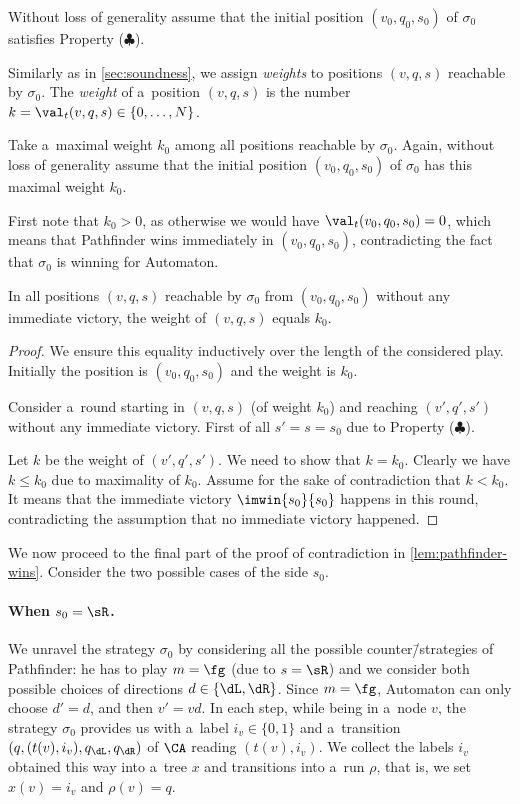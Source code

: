 \documentclass{lmcs}
\numberwithin{equation}{section}
\numberwithin{figure}{section}
\begin{document}
Without loss of generality assume that the initial position $(v_0,q_0,s_0)$ of $\sigma_0$ satisfies Property ($\clubsuit$).

Similarly as in \cref{sec:soundness}, we assign \emph{weights} to positions $(v,q,s)$ reachable by $\sigma_0$.
The \emph{weight} of a~position $(v,q,s)$ is the number $k=\val_t(v,q,s)\in\{0,\ldots,N\}$.

Take a~maximal weight $k_0$ among all positions reachable by $\sigma_0$.
Again, without loss of generality assume that the initial position $(v_0,q_0,s_0)$ of $\sigma_0$ has this maximal weight $k_0$.

First note that $k_0>0$, as otherwise we would have $\val_t(v_0,q_0,s_0)=0$, which means that Pathfinder wins immediately in $(v_0,q_0,s_0)$, contradicting the fact that $\sigma_0$ is winning for Automaton.

\begin{clm}
\label{cl:no-change-weight}
In all positions $(v,q,s)$ reachable by $\sigma_0$ from $(v_0,q_0,s_0)$ without any immediate victory, the weight of $(v,q,s)$ equals $k_0$.
\end{clm}

\begin{proof}
We ensure this equality inductively over the length of the considered play.
Initially the position is $(v_0,q_0,s_0)$ and the weight is $k_0$.

Consider a~round starting in $(v,q,s)$ (of weight $k_0$) and reaching $(v',q',s')$ without any immediate victory.
First of all $s'=s=s_0$ due to Property ($\clubsuit$).

Let $k$ be the weight of $(v',q',s')$.
We need to show that $k=k_0$.
Clearly we have $k\leq k_0$ due to maximality of $k_0$.
Assume for the sake of contradiction that $k<k_0$.
It means that the immediate victory $\imwin{s_0}{s_0}$ happens in this round, contradicting the assumption that no immediate victory happened.
\end{proof}

We now proceed to the final part of the proof of contradiction in \cref{lem:pathfinder-wins}.
Consider the two possible cases of the side $s_0$.


\paragraph*{When $s_0=\sR$.}

We unravel the strategy $\sigma_0$ by considering all the possible counter\=/strategies of Pathfinder:
he has to play $m=\fg$ (due to $s=\sR$) and we consider both possible choices of directions $d\in\{\dL,\dR\}$.
Since $m=\fg$, Automaton can only choose $d'=d$, and then $v'=vd$.
In each step, while being in a~node $v$, the strategy $\sigma_0$ provides us with a~label $i_v\in\{0,1\}$ and a~transition $(q,(t(v),i_v),q_\dL,q_\dR)$ of $\CA$ reading $(t(v),i_v)$.
We collect the labels $i_v$ obtained this way into a~tree $x$ and transitions into a~run $\rho$, that is, we set $x(v)=i_v$ and $\rho(v)=q$.
\end{document}
